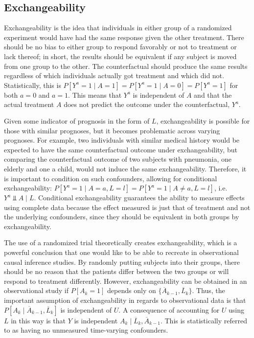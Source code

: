 \subsection{Exchangeability} \label{exchangeability} 
Exchangeability is the idea that individuals in either group of a randomized experiment would have had the same response given the other treatment. \cite{hernan_robins_2016}  There should be no bias to either group to respond favorably or not to treatment or lack thereof; in short, the results should be equivalent if any subject is moved from one group to the other.  The counterfactual should produce the same results regardless of which individuals actually got treatment and which did not.  Statistically, this is $P[Y^a = 1 \mid A = 1] = P[Y^a = 1 \mid A = 0] = P[Y^a = 1]$ for both $a=0$ and $a=1$.  This means that $Y^a$ is independent of $A$ and that the actual treatment $A$ does not predict the outcome under the counterfactual, $Y^a$.  


Given some indicator of prognosis in the form of $L$, exchangeability is possible for those with similar prognoses, but it becomes problematic across varying prognoses.  For example, two individuals with similar medical history would be expected to have the same counterfactual outcome under exchangeability, but comparing the counterfactual outcome of two subjects with pneumonia, one elderly and one a child, would not induce the same exchangeability.  Therefore, it is important to condition on such confounders, allowing for conditional exchangeability: $P[Y^a = 1 \mid A = a, L=l] = P[Y^a = 1 \mid A \neq a, L=l]$, i.e. $Y^{a} \Perp A\mid L$. \cite{hernan_robins_2016}  Conditional exchangeability guarantees the ability to measure effects using complete data because the effect measured is just that of treatment and not the underlying confounders, since they should be equivalent in both groups by exchangeability.  

The use of a randomized trial theoretically creates exchangeability, which is a powerful conclusion that one would like to be able to recreate in observational causal inference studies.   By randomly putting subjects into their groups, there should be no reason that the patients differ between the two groups or will respond to treatment differently.  However, exchangeability can be obtained in an observational study if $P[A_k = 1]$ depends only on $\{\overline{A}_{k-1}, \overline{L}_{k} \}$. Thus, the important assumption of exchangeability in regards to observational data is that  $ P[A_k \mid \overline{A}_{k-1}, \overline{L}_{k} ]$ is independent of $U$.   A consequence of accounting for $U$ using $L$ in this way is that $Y$ is independent $A_k \mid  \overline{L}_{k}, \overline{A}_{k-1}$.  This is statistically referred to as having no unmeasured time-varying confounders.  


